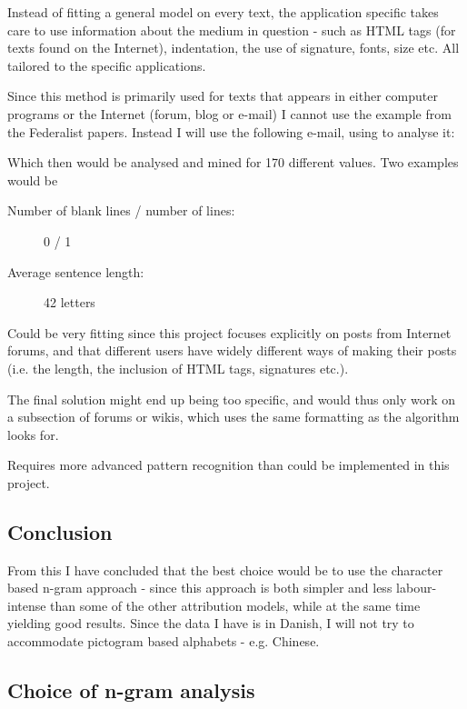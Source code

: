 {\label{application}
Instead of fitting a general model on every text, the application specific takes care to use information about the medium in question - such as HTML tags (for texts found on the Internet), indentation, the use of signature, fonts, size etc. All tailored to the specific applications.
}
{
Since this method is primarily used for texts that appears in either computer programs or the Internet (forum, blog or e-mail) I cannot use the example from the Federalist papers. Instead I will use the following e-mail, using \cite{Vel01mininge-mail} to analyse it: 


Which then would be analysed and mined for 170 different values. Two examples would be
\begin{description}
\item[Number of blank lines / number of lines:] 0 / 1
\item[Average sentence length:] 42 letters
\end{description}
}{
\item Could be very fitting since this project focuses explicitly on posts from Internet forums, and that different users have widely different ways of making their posts (i.e. the length, the inclusion of HTML tags, signatures etc.).
}{
\item The final solution might end up being too specific, and would thus only work on a subsection of forums or wikis, which uses the same formatting as the algorithm looks for.
\item Requires more advanced pattern recognition than could be implemented in this project. 
}

\subsection{Conclusion}
\label{technique:conclusion}
From this I have concluded that the best choice would be to use the character based n-gram approach - since this approach is both simpler and less labour-intense than some of the other attribution models, while at the same time yielding good results. Since the data I have is in Danish, I will not try to accommodate pictogram based alphabets - e.g. Chinese.


\subsection{Choice of n-gram analysis}

